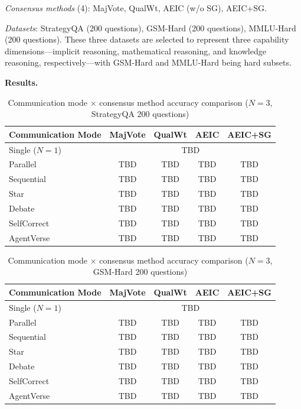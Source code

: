 \documentclass[12pt,a4paper]{article}
\begin{document}
\textit{Consensus methods} (4): MajVote, QualWt, AEIC (w/o SG), AEIC+SG.

\textit{Datasets}: StrategyQA (200 questions), GSM-Hard (200 questions), MMLU-Hard (200 questions). These three datasets are selected to represent three capability dimensions---implicit reasoning, mathematical reasoning, and knowledge reasoning, respectively---with GSM-Hard and MMLU-Hard being hard subsets.

\textbf{Results.}

\begin{table}[H]
\centering
\caption{Communication mode $\times$ consensus method accuracy comparison ($N=3$, StrategyQA 200 questions)}\label{tab:exp1_sqa}
\begin{tabular}{lcccc}
\toprule
Communication Mode & MajVote & QualWt & AEIC & AEIC+SG \\
\midrule
Single ($N=1$) & \multicolumn{4}{c}{TBD} \\
Parallel & TBD & TBD & TBD & TBD \\
Sequential & TBD & TBD & TBD & TBD \\
Star & TBD & TBD & TBD & TBD \\
Debate & TBD & TBD & TBD & TBD \\
SelfCorrect & TBD & TBD & TBD & TBD \\
AgentVerse & TBD & TBD & TBD & TBD \\
\bottomrule
\end{tabular}
\end{table}

\begin{table}[H]
\centering
\caption{Communication mode $\times$ consensus method accuracy comparison ($N=3$, GSM-Hard 200 questions)}\label{tab:exp1_gsm}
\begin{tabular}{lcccc}
\toprule
Communication Mode & MajVote & QualWt & AEIC & AEIC+SG \\
\midrule
Single ($N=1$) & \multicolumn{4}{c}{TBD} \\
Parallel & TBD & TBD & TBD & TBD \\
Sequential & TBD & TBD & TBD & TBD \\
Star & TBD & TBD & TBD & TBD \\
Debate & TBD & TBD & TBD & TBD \\
SelfCorrect & TBD & TBD & TBD & TBD \\
AgentVerse & TBD & TBD & TBD & TBD \\
\bottomrule
\end{tabular}
\end{table}
\end{document}
